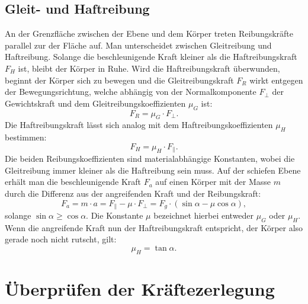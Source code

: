 \documentclass{article}
\begin{document}
\subsection{Gleit- und Haftreibung}
An der Grenzfläche zwischen der Ebene und dem Körper treten Reibungskräfte parallel zur der Fläche auf. Man unterscheidet zwischen Gleitreibung und Haftreibung. Solange die beschleunigende Kraft kleiner als die Haftreibungskraft $F_H$ ist, bleibt der Körper in Ruhe. Wird die Haftreibungskraft überwunden, beginnt der Körper sich zu bewegen und die Gleitreibungskraft $F_R$ wirkt entgegen der Bewegungsrichtung, welche abhängig von der Normalkomponente $F_{\bot}$ der Gewichtskraft und dem Gleitreibungskoeffizienten $\mu_G$ ist:
\begin{equation}
    F_R = \mu_G \cdot F_{\bot}.
\end{equation} Die Haftreibungskraft lässt sich analog mit dem Haftreibungskoeffizienten $\mu_H$ bestimmen:
\begin{equation}
    F_H = \mu_H \cdot F_{\parallel}.
\end{equation}
Die beiden Reibungskoeffizienten sind materialabhängige Konstanten, wobei die Gleitreibung immer
kleiner als die Haftreibung sein muss. Auf der schiefen Ebene erhält man die beschleunigende Kraft $F_a$ auf einen Körper mit der Masse $m$ durch die Differenz aus der angreifenden Kraft und der Reibungskraft:
\begin{equation}
    F_a = m \cdot a = F_{\parallel} - \mu \cdot F_{\bot} = F_g \cdot (\sin \alpha - \mu \cos \alpha),
\end{equation} solange $\sin \alpha \geq \cos \alpha$. Die Konstante $\mu$ bezeichnet hierbei entweder $\mu_G$ oder $\mu_H$. Wenn die angreifende Kraft nun der  Haftreibungskraft entspricht, der Körper also gerade noch nicht rutscht, gilt:
\begin{equation}
    \mu_H= \tan \alpha.
\end{equation}
\section{Überprüfen der Kräftezerlegung}
\end{document}
